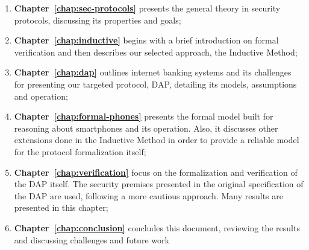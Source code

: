 \begin{enumerate}
    \item \textbf{Chapter~\ref{chap:sec-protocols}} presents the general theory in security protocols, discussing its properties and goals;

    \item \textbf{Chapter~\ref{chap:inductive}} begins with a brief introduction on formal verification and then describes our selected approach, the Inductive Method;

    \item \textbf{Chapter~\ref{chap:dap}} outlines internet banking systems and its challenges for presenting our targeted protocol, DAP, detailing its models, assumptions and operation;
    
    \item \textbf{Chapter~\ref{chap:formal-phones}} presents the formal model built for reasoning about smartphones and its operation. Also, it discusses other extensions done in the Inductive Method in order to provide a reliable model for the protocol formalization itself;

    \item \textbf{Chapter~\ref{chap:verification}} focus on the formalization and verification of the DAP itself. The security premises presented in the original specification of the DAP are used, following a more cautious approach. Many results are presented in this chapter; 
    
    \item \textbf{Chapter~\ref{chap:conclusion}} concludes this document, reviewing the results and discussing challenges and future work
\end{enumerate}
